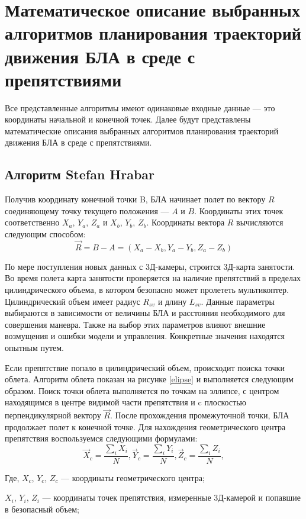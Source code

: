\section{Математическое описание выбранных алгоритмов планирования траекторий движения БЛА в среде с препятствиями}
Все представленные алгоритмы имеют одинаковые входные данные --- это координаты начальной и конечной точек.
Далее будут представлены математические описания выбранных алгоритмов планирования траекторий движения БЛА в среде с препятствиями.

\subsection{Алгоритм Stefan Hrabar}
Получив координату конечной точки B, БЛА начинает полет по вектору $R$ соединяющему точку текущего положения --- $A$ и $B$. 
Координаты этих точек соответственно $X_a$, $Y_a$, $Z_a$ и $X_b$, $Y_b$, $Z_b$. 
Координаты вектора $R$ вычисляются следующим способом:
$$\overrightarrow{R}=B-A=(X_a-X_b,Y_a-Y_b,Z_a-Z_b)$$

По мере поступления новых данных с 3Д-камеры, строится 3Д-карта занятости.
Во время полета карта занятости проверяется на наличие препятствий в пределах цилиндрического объема, в котором безопасно может пролететь мультикоптер.
Цилиндрический объем имеет радиус $R_{sv}$ и длину $L_{sv}$.
Данные параметры выбираются в зависимости от величины БЛА и расстояния необходимого для совершения маневра. 
Также на выбор этих параметров влияют внешние возмущения и ошибки модели и управления.
Конкретные значения находятся опытным путем.

Если препятствие попало в цилиндрический объем, происходит поиска точки облета.
Алгоритм облета показан на рисунке \ref{elipse} и выполняется следующим образом.
Поиск точки облета выполняется по точкам на эллипсе, с центром находящимся в центре видимой части препятствия и c плоскостью перпендикулярной вектору $\vec{R}$.
После прохождения промежуточной точки, БЛА продолжает полет к конечной точке.
Для нахождения геометрического центра препятствия воспользуемся следующими формулами:
$$
{\vec  X}_{c}={\frac  {\sum \limits _{i}{X}_{i}}{N}}, 
{\vec  Y}_{c}={\frac  {\sum \limits _{i}{Y}_{i}}{N}}, 
{\vec  Z}_{c}={\frac  {\sum \limits _{i}{Z}_{i}}{N}}, 
$$

Где, $X_c$, $Y_c$, $Z_c$ --- координаты геометрического центра;

$X_i$, $Y_i$, $Z_i$ --- координаты точек препятствия, измеренные 3Д-камерой и попавшие в безопасный объем;

